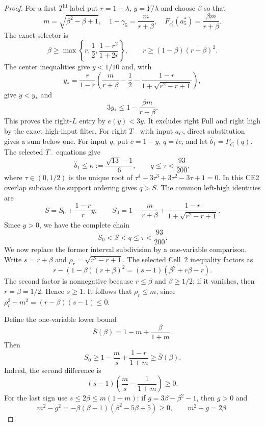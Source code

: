 \begin{proof}
For a first $T_+^{\mathrm{hi}}$ label put $r=1-\lambda$,
$y=Y/\lambda$ and choose $\beta$ so that
\[
 m=\sqrt{\beta^2-\beta+1},\quad
 1-\gamma_5=\frac m{r+\beta},\quad
 F_{c_5^\ast}(a_5^\ast)=\frac{\beta m}{r+\beta}.
\]
The exact selector is
\begin{equation}
 \beta\ge\max\left\{r,\frac12,\frac{1-r^2}{1+2r}\right\},\qquad
 r\ge(1-\beta)(r+\beta)^2.
 \label{eq:407-high-domain}
\end{equation}
The center inequalities give $y<1/10$ and, with
\[
 y_*=\frac r{1-r}
 \left(\frac m{r+\beta}-\frac12-\frac{1-r}{1+\sqrt{r^2-r+1}}\right),
\]
give $y<y_*$ and
\[
 3y_*\le1-\frac{\beta m}{r+\beta}.
\]
This proves the right-$L$ entry by $e(y)<3y$.  It excludes right Full and
right high by the exact high-input filter.  For right $T_-$ with input
$a_C$, direct substitution gives a sum below one.  For input $q$, put
$c=1-y$, $q=tc$, and let $\widehat b_1=F_{c_1^\ast}(q)$.  The selected $T_-$ equations
give
\[
 \widehat b_1\le\kappa:=\frac{\sqrt{13}-1}{6},\qquad
 q\le\tau<\frac{93}{200},
\]
where $\tau\in(0,1/2)$ is the unique root of
$\tau^4-3\tau^3+3\tau^2-3\tau+1=0$.  In this CE2 overlap subcase the
support ordering gives $q>S$.  The common left-high identities are
\[
 S=S_0+\frac{1-r}{r}y,\qquad
 S_0=1-\frac{m}{r+\beta}+\frac{1-r}{1+\sqrt{r^2-r+1}}.
\]
Since $y>0$, we have the complete chain
\[
 S_0<S<q\le\tau<\frac{93}{200}.
\]
We now replace the former interval subdivision by a one-variable comparison.
Write $s=r+\beta$ and $\rho_r=\sqrt{r^2-r+1}$.  The selected Cell~2
inequality factors as
\[
 r-(1-\beta)(r+\beta)^2
 =(s-1)(\beta^2+r\beta-r).
\]
The second factor is nonnegative because $r\le\beta$ and $\beta\ge1/2$;
if it vanishes, then $r=\beta=1/2$.  Hence $s\ge1$.  It follows that
$\rho_r\le m$, since
$\rho_r^2-m^2=(r-\beta)(s-1)\le0$.

Define the one-variable lower bound
\[
 \overline S(\beta)=1-m+\frac{\beta}{1+m}.
\]
Then
\[
 S_0\ge1-\frac m s+\frac{1-r}{1+m}\ge\overline S(\beta).
\]
Indeed, the second difference is
\[
 (s-1)\left(\frac m s-\frac1{1+m}\right)\ge0.
\]
For the last sign use $s\le2\beta\le m(1+m)$: if
$g=3\beta-\beta^2-1$, then $g>0$ and
\[
 m^2-g^2=-\beta(\beta-1)(\beta^2-5\beta+5)\ge0,
 \qquad m^2+g=2\beta.
\]


\end{proof}
